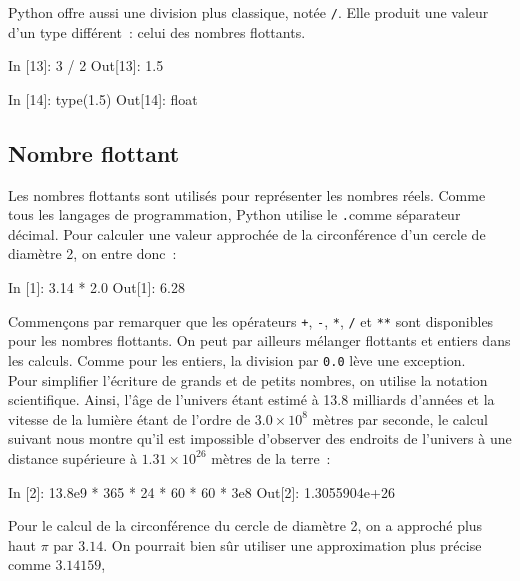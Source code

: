 \documentclass{magnolia}
\begin{document}
Python offre aussi une division plus classique, notée \verb_/_. Elle produit
une valeur d'un type différent~: celui des nombres flottants.

\begin{pythoncode}
In [13]: 3 / 2
Out[13]: 1.5

In [14]: type(1.5)
Out[14]: float
\end{pythoncode}

\subsection{Nombre flottant}

Les nombres flottants sont utilisés pour représenter les nombres réels. Comme tous
les langages de programmation, Python utilise le \og\verb_._\fg comme séparateur décimal.
Pour calculer une valeur approchée de la circonférence d'un cercle de diamètre 2, on entre
donc~:

\begin{pythoncode}
In [1]: 3.14 * 2.0
Out[1]: 6.28
\end{pythoncode}

\noindent Commençons par remarquer que les opérateurs \verb!+!, \verb!-!, \verb!*!, \verb!/! 
et \verb!**! sont
disponibles pour les nombres flottants. On peut par ailleurs mélanger flottants et
entiers dans les calculs. Comme pour les entiers, la division par \verb_0.0_ lève une
exception.\\

Pour simplifier l'écriture de grands et de petits nombres, on utilise la notation
scientifique. Ainsi, l'âge de l'univers étant estimé à 13.8 milliards d'années et la vitesse
de la lumière étant de l'ordre de $3.0\times 10^8$ mètres par seconde,
le calcul suivant nous montre qu'il est impossible
d'observer des endroits de l'univers à une distance supérieure à $1.31\times 10^{26}$
mètres de la terre~:

\begin{pythoncode}
In [2]: 13.8e9 * 365 * 24 * 60 * 60 * 3e8
Out[2]: 1.3055904e+26
\end{pythoncode}

Pour le calcul de la circonférence du cercle de diamètre 2, on a approché plus haut $\pi$ par $3.14$.
On pourrait bien sûr utiliser une approximation plus précise comme $3.14159$,
\end{document}
